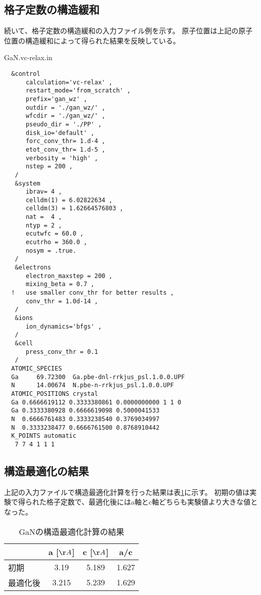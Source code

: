 \subsection{格子定数の構造緩和}
続いて、格子定数の構造緩和の入力ファイル例を示す。
原子位置は上記の原子位置の構造緩和によって得られた結果を反映している。
\begin{example}{GaN.vc-relax.in}
\begin{verbatim}
  &control
      calculation='vc-relax' ,
      restart_mode='from_scratch' ,
      prefix='gan_wz' ,
      outdir = './gan_wz/' ,
      wfcdir = './gan_wz/' ,
      pseudo_dir = './PP' ,
      disk_io='default' ,
      forc_conv_thr= 1.d-4 ,
      etot_conv_thr= 1.d-5 ,
      verbosity = 'high' ,
      nstep = 200 ,
   /
   &system
      ibrav= 4 ,
      celldm(1) = 6.02822634 ,
      celldm(3) = 1.62664576803 ,
      nat =  4 ,
      ntyp = 2 ,
      ecutwfc = 60.0 ,
      ecutrho = 360.0 ,
      nosym = .true.
   /
   &electrons
      electron_maxstep = 200 ,
      mixing_beta = 0.7 ,
  !   use smaller conv_thr for better results ,
      conv_thr = 1.0d-14 ,
   /
   &ions
      ion_dynamics='bfgs' ,
   /
   &cell
      press_conv_thr = 0.1
   /
  ATOMIC_SPECIES
  Ga     69.72300  Ga.pbe-dnl-rrkjus_psl.1.0.0.UPF
  N      14.00674  N.pbe-n-rrkjus_psl.1.0.0.UPF
  ATOMIC_POSITIONS crystal
  Ga 0.6666619112 0.3333380861 0.0000000000 1 1 0
  Ga 0.3333380928 0.6666619098 0.5000041533
  N  0.6666761483 0.3333238540 0.3769034997
  N  0.3333238477 0.6666761500 0.8768910442
  K_POINTS automatic
   7 7 4 1 1 1
\end{verbatim}
\end{example}

\subsection{構造最適化の結果}
上記の入力ファイルで構造最適化計算を行った結果は表\ref{gan_str-opt}に示す。
初期の値は実験で得られた格子定数で、最適化後にはa軸とc軸どちらも実験値より大きな値となった。

\begin{table}[hbt]
  \caption{GaNの構造最適化計算の結果}
  \label{gan_str-opt}
  \centering
  \begin{tabular}{lccc}
    \hline
     & a [$\AA$] & c [$\AA$] & a/c \\
     \hline \hline
     初期 & 3.19 & 5.189 & 1.627 \\
     最適化後 & 3.215 & 5.239 & 1.629\\
     \hline
  \end{tabular}
\end{table}

